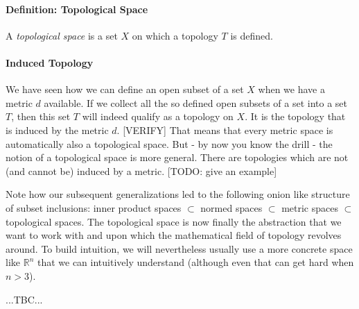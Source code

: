 \paragraph{Definition: Topological Space} A \emph{topological space} is a set $X$ on which a topology $T$ is defined.


\paragraph{Induced Topology} 
We have seen how we can define an open subset of a set $X$ when we have a metric $d$ available. If we collect all the so defined open subsets of a set into a set $T$, then this set $T$ will indeed qualify as a topology on $X$. It is the topology that is induced by the metric $d$. [VERIFY] That means that every metric space is automatically also a topological space. But - by now you know the drill - the notion of a topological space is more general. There are topologies which are not (and cannot be) induced by a metric. [TODO: give an example]


\medskip
Note how our subsequent generalizations led to the following onion like structure of subset inclusions: inner product spaces $\subset$ normed spaces $\subset$ metric spaces $\subset$ topological spaces. The topological space is now finally the abstraction that we want to work with and upon which the mathematical field of topology revolves around. To build intuition, we will nevertheless usually use a more concrete space like $\mathbb{R}^n$ that we can intuitively understand (although even that can get hard when $n > 3$).



...TBC...






